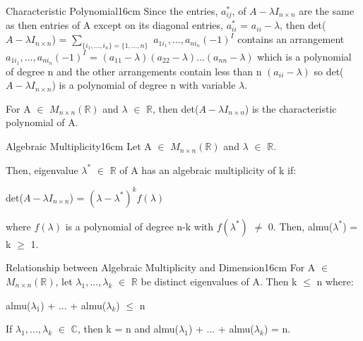     \vspace{0.5cm}



    \begin{definition}{Characteristic Polynomial}{16cm}
        Since the entries, $a_{ij}^*$, of $A - \lambda I_{n \times n}$
        are the same as then entries of A except on its diagonal entries,
        $a_{ii}^*$ = $a_{ii} - \lambda$, then
        det($A - \lambda I_{n \times n}$)
        = $\sum_{\{i_1,...,i_n\}=\{1,...,n\}}$ $a_{1i_1},...,a_{ni_n}(-1)^I$
        contains an arrangement $a_{1i_1},...,a_{ni_n}(-1)^I$
        = $(a_{11}-\lambda)(a_{22}-\lambda)...(a_{nn}-\lambda)$
        which is a polynomial of degree n and the other arrangements
        contain less than n $(a_{ii} - \lambda)$ so
        det($A - \lambda I_{n \times n}$) is a polynomial of degree n
        with variable $\lambda$.

        \vspace{0.3cm}

        For A $\in$ $M_{n \times n}(\mathbb{R})$ and $\lambda$ $\in$ $\mathbb{R}$,
        then det($A - \lambda I_{n \times n}$) is the
        {\color{lblue} characteristic polynomial} of A.
    \end{definition}

    \vspace{0.5cm}



    \begin{definition}{Algebraic Multiplicity}{16cm}
        Let A $\in$ $M_{n \times n}(\mathbb{R})$ and $\lambda$ $\in$ $\mathbb{R}$.

        Then, eigenvalue $\lambda^*$ $\in$ $\mathbb{R}$ of A
        has an {\color{lblue} algebraic multiplicity} of k if:
        
        \hspace{0.5cm}
        det($A - \lambda I_{n \times n}$)
        = $(\lambda - \lambda^*)^k f(\lambda)$

        where $f(\lambda)$ is a polynomial of degree n-k with
        $f(\lambda^*)$ $\not =$ 0.
        Then, almu($\lambda^*$) = k $\geq$ 1.
    \end{definition}

    \vspace{0.5cm}



    \begin{wtheorem}{Relationship between Algebraic Multiplicity
    and Dimension}{16cm}
        For A $\in$ $M_{n \times n}(\mathbb{R})$, let
        $\lambda_1,...,\lambda_k$ $\in$ $\mathbb{R}$
        be distinct eigenvalues of A. Then k $\leq$ n where:

        \hspace{0.5cm}
        almu($\lambda_1$) + ... + almu($\lambda_k$) $\leq$ n

        If $\lambda_1,...,\lambda_k$ $\in$ $\mathbb{C}$,
        then k = n and almu($\lambda_1$) + ... + almu($\lambda_k$) = n.
    \end{wtheorem}

